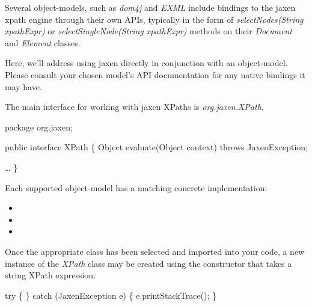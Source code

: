 \documentclass[20pt,landscape,headrule,footrule]{foils}
\begin{document}

Several object-models, such as \emph{dom4j} and \emph{EXML} include
bindings to the jaxen xpath engine through their own APIs, typically
in the form of \emph{selectNodes(String xpathExpr)} or
\emph{selectSingleNode(String xpathExpr)} methods on
their \emph{Document} and \emph{Element} classes.

Here, we'll address using jaxen directly in conjunction with an
object-model.  Please consult your chosen model's API documentation
for any native bindings it may have.



The main interface for working with jaxen XPaths is
\emph{org.jaxen.XPath}.

\begin{codelisting}
package org.jaxen;

public interface XPath
\{
    Object evaluate(Object context)
        throws JaxenException;

    \dots
\}
\end{codelisting}

Each supported object-model has a matching concrete implementation:

\begin{minipage}{\textwidth}
\small
\begin{itemize}
  \item {}
  \item {}
  \item {}
\end{itemize}
\end{minipage}



Once the appropriate class has been selected and imported into your
code, a new instance of the \emph{XPath} class may be created
using the constructor that takes a string XPath expression.

\begin{codelisting}
try
\{
\}
catch (JaxenException e)
\{
    e.printStackTrace();
\}
\end{codelisting}
\end{document}
